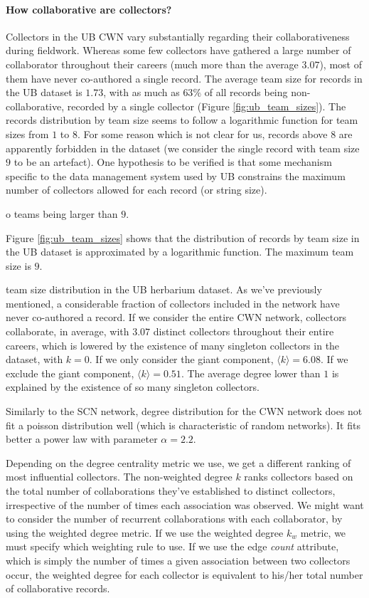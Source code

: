 \paragraph*{How collaborative are collectors?}
Collectors in the UB CWN vary substantially regarding their collaborativeness during fieldwork.
Whereas some few collectors have gathered a large number of collaborator throughout their careers (much more than the average $3.07$), most of them have never co-authored a single record.
%
The average team size for records in the UB dataset is $1.73$, with as much as $63\%$ of all records being non-collaborative, recorded by a single collector (Figure \ref{fig:ub_team_sizes}).
The records distribution by team size seems to follow a logarithmic function for team sizes from $1$ to $8$.
For some reason which is not clear for us, records above $8$ are apparently forbidden in the dataset (we consider the single record with team size $9$ to be an artefact).
One hypothesis to be verified is that some mechanism specific to the data management system used by UB constrains the maximum number of collectors allowed for each record (or string size).


o teams being larger than $9$.

Figure \ref{fig:ub_team_sizes} shows that the distribution of records by team size in the UB dataset is approximated by a logarithmic function.
The maximum team size is $9$.

team size distribution in the UB herbarium dataset.
As we've previously mentioned, a considerable fraction of collectors included in the network have never co-authored a record.
If we consider the entire CWN network, collectors collaborate, in average, with $3.07$ distinct collectors throughout their entire careers, which is lowered by the existence of many singleton collectors in the dataset, with $k=0$.
If we only consider the giant component, $\langle k\rangle = 6.08$.
If we exclude the giant component, $\langle k\rangle = 0.51$. 
The average degree lower than $1$ is explained by the existence of so many singleton collectors.

Similarly to the SCN network, degree distribution for the CWN network does not fit a poisson distribution well (which is characteristic of random networks). 
It fits better a power law with parameter $\alpha=2.2$.



Depending on the degree centrality metric we use, we get a different ranking of most influential collectors.
The non-weighted degree $k$ ranks collectors based on the total number of collaborations they've established to distinct collectors, irrespective of the number of times each association was observed.
We might want to consider the number of recurrent collaborations with each collaborator, by using the weighted degree metric.
If we use the weighted degree $k_w$ metric, we must specify which weighting rule to use. 
If we use the edge \textit{count} attribute, which is simply the number of times a given association between two collectors occur, the weighted degree for each collector is equivalent to his/her total number of collaborative records. 

